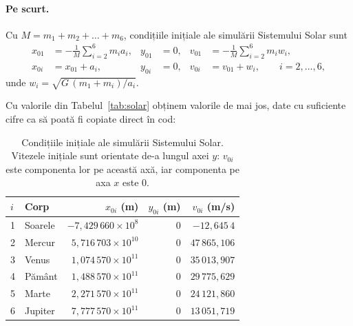 \documentclass[11pt,a4paper]{article}
\begin{document}
\paragraph{Pe scurt.} Cu $M = m_1 + m_2 + \dots + m_6$, condițiile inițiale ale simulării Sistemului Solar sunt
\begin{align*}
  x_{01} &= -\frac{1}{M}\sum_{i=2}^{6} m_i a_i, & y_{01} &= 0, & v_{01} &= -\frac{1}{M}\sum_{i=2}^{6} m_i w_i,\\
  x_{0i} &= x_{01} + a_i, & y_{0i} &= 0, & v_{0i} &= v_{01} + w_i, \qquad i = 2, \dots, 6,
\end{align*}
unde $w_i = \sqrt{G\,(m_1 + m_i)/a_i}$.

Cu valorile din Tabelul~\ref{tab:solar} obținem valorile de mai jos, date cu suficiente cifre ca să poată fi copiate direct în cod:

\begin{table}[H]
\centering
\begin{tabular}{@{}llrrr@{}}
\toprule
$i$ & Corp & $x_{0i}$ (m) & $y_{0i}$ (m) & $v_{0i}$ (m/s) \\
\midrule
1 & Soarele & $-7{,}429\,660\times10^{8}$  & $0$ & $-12{,}645\,4$ \\
2 & Mercur  & $5{,}716\,703\times10^{10}$  & $0$ & $47\,865{,}106$ \\
3 & Venus   & $1{,}074\,570\times10^{11}$  & $0$ & $35\,013{,}907$ \\
4 & Pământ  & $1{,}488\,570\times10^{11}$  & $0$ & $29\,775{,}629$ \\
5 & Marte   & $2{,}271\,570\times10^{11}$  & $0$ & $24\,121{,}860$ \\
6 & Jupiter & $7{,}777\,570\times10^{11}$  & $0$ & $13\,051{,}719$ \\
\bottomrule
\end{tabular}
\caption{Condițiile inițiale ale simulării Sistemului Solar. Vitezele inițiale sunt orientate de-a lungul axei $y$: $v_{0i}$ este componenta lor pe această axă, iar componenta pe axa $x$ este $0$.}
\label{tab:ci-solar}
\end{table}
\end{document}
